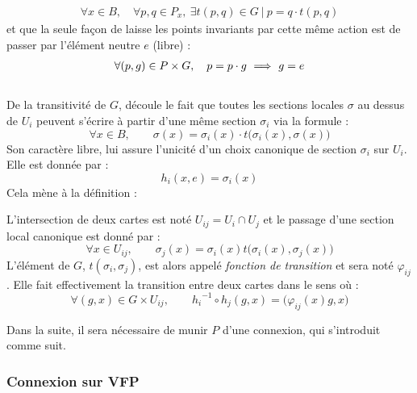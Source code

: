\begin{align*}
	\forall x\in B,\quad \forall p,q\in P_x,\ \exists t(p,q)\in G\ |\ p = q\cdot t(p,q) 
\end{align*}
et que la seule façon de laisse les points invariants par cette même action est de passer par l'élément neutre $e$ (libre) :
\begin{align*}
	\forall (p,g)\in P\times G,\quad p = p\cdot g\ \Longrightarrow\ g=e
\end{align*}
\\
De la transitivité de $G$, découle le fait que toutes les sections locales $\sigma$ au dessus de $U_i$ peuvent s'écrire à partir d'une même section $\sigma_i$ via la formule :
\[\forall x\in B,\qquad \sigma(x) = \sigma_i(x) \cdot t\big(\sigma_i(x), \sigma(x)\big)\]
Son caractère libre, lui assure l'unicité d'un choix canonique de section $\sigma_i$ sur $U_i$. Elle est donnée par :
\[{h_i}(x,e) = \sigma_i(x)\]
Cela mène à la définition :
\begin{definition}
	L'intersection de deux cartes  est noté $U_{ij} = U_i\cap U_j$ et le passage d'une section local canonique est donné par :
	\[\forall x\in U_{ij},\qquad \sigma_j(x) = \sigma_i(x) t\big(\sigma_i(x), \sigma_j(x)\big)\]
	L'élément de $G$, $t(\sigma_i, \sigma_j)$, est alors appelé \emph{fonction de transition} et sera noté $\varphi_{ij}$. Elle fait effectivement la transition entre deux cartes dans le sens où :
	\[\forall (g,x)\in G\times U_{ij},\qquad {h_i}^{-1} \circ h_j(g,x) = \big( \varphi_{ij}(x)g, x \big)\]
\end{definition}
\skipl

Dans la suite, il sera nécessaire de munir $P$ d'une connexion, qui s'introduit comme suit.
\\



\subsubsection{Connexion sur VFP}

